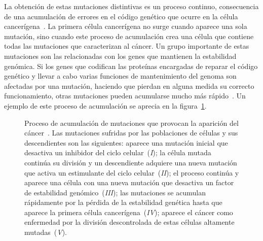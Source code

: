 La obtenci\'on de estas mutaciones distintivas es un proceso continuo, consecuencia de una acumulaci\'on de errores en el c\'odigo gen\'etico que ocurre en la c\'elula cancer\'igena~\cite{invasion,cancerbook}. La primera c\'elula cancer\'igena no surge cuando aparece una sola mutaci\'on, sino cuando este proceso de acumulaci\'on crea una c\'elula que contiene todas las mutaciones que caracterizan al c\'ancer. Un grupo importante de estas mutaciones son las relacionadas con los genes que mantienen la estabilidad gen\'omica. Si los genes que codifican las prote\'inas encargadas de reparar el c\'odigo gen\'etico y llevar a cabo varias funciones de mantenimiento del genoma son afectadas por una mutaci\'on, haciendo que pierdan en alguna medida su correcto funcionamiento, otras mutaciones pueden acumularse mucho m\'as r\'apido~\cite{robins}. Un ejemplo de este proceso de acumulaci\'on se aprecia en la figura~\ref{fig-evolution}.

\begin{figure}[!ht]
\begin{center}
\end{center}\vspace*{-0.6cm}
\caption[Proceso de acumulaci\'on de mutaciones que provocan la aparici\'on del c\'ancer]{Proceso de acumulaci\'on de mutaciones que provocan la aparici\'on del c\'ancer~\cite{robins}. Las mutaciones sufridas por las poblaciones de c\'elulas y sus descendientes son las siguientes: aparece una mutaci\'on inicial que desactiva un inhibidor del ciclo celular~(\emph{I}); la c\'elula mutada contin\'ua su divisi\'on y un descendiente adquiere una nueva mutaci\'on que activa un estimulante del ciclo celular~(\emph{II}); el proceso contin\'ua y aparece una c\'elula con una nueva mutaci\'on que desactiva un factor de estabilidad gen\'omico~(\emph{III}); las mutaciones se acumulan r\'apidamente por la p\'erdida de la estabilidad gen\'etica hasta que aparece la primera c\'elula cancer\'igena~(\emph{IV}); aparece el c\'ancer como enfermedad por la divisi\'on descontrolada de estas c\'elulas altamente mutadas~(\emph{V}).}
\label{fig-evolution}
\end{figure}

